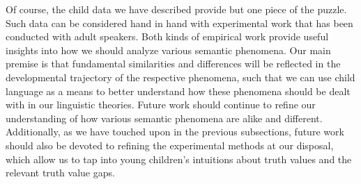 \documentclass[12pt, letterpaper]{article}
\begin{document}
{Of course, the child data we have described provide but one piece of the puzzle. Such data can be considered hand in hand with experimental work that has been conducted with adult speakers. Both kinds of empirical work provide useful insights into how we should analyze various semantic phenomena. Our main premise is that fundamental similarities and differences will be reflected in the developmental trajectory of the respective phenomena, such that we can use child language as a means to better understand how these phenomena should be dealt with in our linguistic theories. 
Future work should continue to refine our understanding of how various semantic phenomena are alike and different. Additionally, as we have touched upon in the previous subsections, future work should also be devoted to refining the experimental methods at our disposal, which allow us to tap into young children's intuitions about truth values and the relevant truth value gaps. 







}
\end{document}
